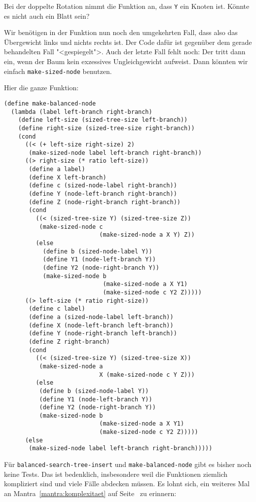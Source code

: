 %
\begin{aufgabeinline}
  Bei der doppelte Rotation nimmt die Funktion an, dass \lstinline{Y}
  ein Knoten ist.  Könnte es nicht auch ein Blatt sein?
\end{aufgabeinline}
%
Wir benötigen in der Funktion nun noch den umgekehrten Fall, dass also
das Übergewicht links und nichts rechts ist.  Der Code dafür ist
gegenüber dem gerade behandelten Fall "<gespiegelt">.  Auch der letzte
Fall fehlt noch: Der tritt dann ein,  wenn der Baum kein exzessives
Ungleichgewicht aufweist.  Dann könnten wir einfach
\lstinline{make-sized-node} benutzen.

Hier die ganze Funktion:\label{func:make-balanced-node}
%
\begin{lstlisting}
(define make-balanced-node
  (lambda (label left-branch right-branch)
    (define left-size (sized-tree-size left-branch))
    (define right-size (sized-tree-size right-branch))
    (cond
      ((< (+ left-size right-size) 2)
       (make-sized-node label left-branch right-branch))
      ((> right-size (* ratio left-size))
       (define a label)
       (define X left-branch)
       (define c (sized-node-label right-branch))
       (define Y (node-left-branch right-branch))
       (define Z (node-right-branch right-branch))
       (cond
         ((< (sized-tree-size Y) (sized-tree-size Z))
          (make-sized-node c
                           (make-sized-node a X Y) Z))
         (else
           (define b (sized-node-label Y))
           (define Y1 (node-left-branch Y))
           (define Y2 (node-right-branch Y))
           (make-sized-node b
                            (make-sized-node a X Y1)
                            (make-sized-node c Y2 Z)))))
      ((> left-size (* ratio right-size))
       (define c label)
       (define a (sized-node-label left-branch))
       (define X (node-left-branch left-branch))
       (define Y (node-right-branch left-branch))
       (define Z right-branch)
       (cond
         ((< (sized-tree-size Y) (sized-tree-size X))
          (make-sized-node a
                           X (make-sized-node c Y Z)))
         (else
          (define b (sized-node-label Y))
          (define Y1 (node-left-branch Y))
          (define Y2 (node-right-branch Y))
          (make-sized-node b
                           (make-sized-node a X Y1)
                           (make-sized-node c Y2 Z)))))
      (else
       (make-sized-node label left-branch right-branch)))))
\end{lstlisting}
%
Für
\lstinline{balanced-search-tree-insert} und
\lstinline{make-balanced-node} gibt es bisher noch keine Tests.
Das ist bedenklich, insbesondere weil
die Funktionen ziemlich kompliziert sind und viele Fälle abdecken
müssen.  Es lohnt sich, ein weiteres Mal an
Mantra~\ref{mantra:komplexitaet} auf
Seite~\pageref{mantra:komplexitaet} zu erinnern:

